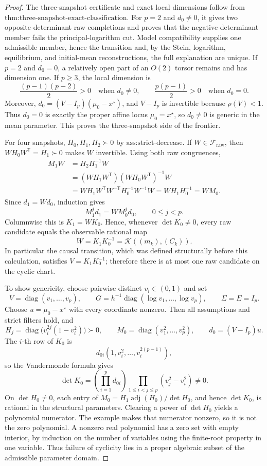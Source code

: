 \documentclass{article}
\begin{document}
\begin{proof}
The three-snapshot certificate and exact local dimensions follow from \(\text{thm:three-snapshot-exact-classification}\).  For \(p=2\) and \(d_0\ne0\), it gives two opposite-determinant raw completions and proves that the negative-determinant member fails the principal-logarithm cut.  Model compatibility supplies one admissible member, hence the transition and, by the Stein, logarithm, equilibrium, and initial-mean reconstructions, the full explanation are unique.  If \(p=2\) and \(d_0=0\), a relatively open part of an \(O(2)\) torsor remains and has dimension one.  If \(p\ge3\), the local dimension is
\[
 \frac{(p-1)(p-2)}2>0\quad\text{when }d_0\ne0,
 \qquad
 \frac{p(p-1)}2>0\quad\text{when }d_0=0.
\]
Moreover, \(d_0=(V-I_p)(\mu_0-x^\star)\), and \(V-I_p\) is invertible because \(\rho(V)<1\).  Thus \(d_0=0\) is exactly the proper affine locus \(\mu_0=x^\star\), so \(d_0\ne0\) is generic in the mean parameter.  This proves the three-snapshot side of the frontier.

For four snapshots, \(H_0,H_1,H_2\succ0\) by \(\text{ass:strict-decrease}\).  If \(W\in\mathcal F_{\mathrm{raw}}\), then \(WH_0W^{\mathsf T}=H_1\succ0\) makes \(W\) invertible.  Using both raw congruences,
\[
 \begin{aligned}
 M_1W
 &=H_2H_1^{-1}W\\
 &=(WH_1W^{\mathsf T})(WH_0W^{\mathsf T})^{-1}W\\
 &=WH_1W^{\mathsf T}W^{-\mathsf T}H_0^{-1}W^{-1}W
 =WH_1H_0^{-1}=WM_0.
 \end{aligned}
\]
Since \(d_1=Wd_0\), induction gives
\[
 M_1^jd_1=WM_0^jd_0,\qquad 0\leq j<p.
\]
Columnwise this is \(K_1=WK_0\).  Hence, whenever \(\det K_0\ne0\), every raw candidate equals the observable rational map
\[
 W=K_1K_0^{-1}=\mathcal K((m_k),(C_k)).
\]
In particular the causal transition, which was defined structurally before this calculation, satisfies \(V=K_1K_0^{-1}\); therefore there is at most one raw candidate on the cyclic chart.

To show genericity, choose pairwise distinct \(v_i\in(0,1)\) and set
\[
 V=\operatorname{diag}(v_1,\ldots,v_p),\qquad
 G=h^{-1}\operatorname{diag}(\log v_1,\ldots,\log v_p),
 \qquad \Sigma=E=I_p.
\]
Choose \(u=\mu_0-x^\star\) with every coordinate nonzero.  Then all assumptions and strict filters hold, and
\[
 H_j=\operatorname{diag}\bigl(v_i^{2j}(1-v_i^2)\bigr)\succ0,\qquad
 M_0=\operatorname{diag}(v_1^2,\ldots,v_p^2),\qquad
 d_0=(V-I_p)u.
\]
The \(i\)-th row of \(K_0\) is
\[
 d_{0i}(1,v_i^2,\ldots,v_i^{2(p-1)}),
\]
so the Vandermonde formula gives
\[
 \det K_0=\left(\prod_{i=1}^pd_{0i}\right)
 \prod_{1\leq i<j\leq p}(v_j^2-v_i^2)\ne0.
\]
On \(\det H_0\ne0\), each entry of \(M_0=H_1\operatorname{adj}(H_0)/\det H_0\), and hence \(\det K_0\), is rational in the structural parameters.  Clearing a power of \(\det H_0\) yields a polynomial numerator.  The example makes that numerator nonzero, so it is not the zero polynomial.  A nonzero real polynomial has a zero set with empty interior, by induction on the number of variables using the finite-root property in one variable.  Thus failure of cyclicity lies in a proper algebraic subset of the admissible parameter domain.


\end{proof}
\end{document}
